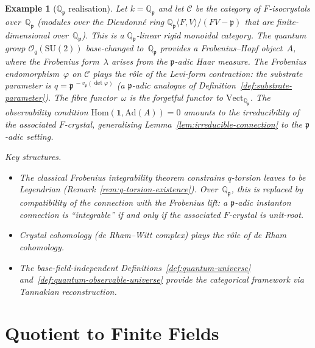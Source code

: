\documentclass[12pt,a4paper]{report}
\newtheorem{example}[theorem]{Example}
\newcommand{\pp}{\mathfrak{p}}
\begin{document}
\begin{example}[$\mathbb{Q}_\pp$ realisation]
\label{ex:p-adic-realisation}
Let $k = \mathbb{Q}_\pp$ and let $\mathcal{C}$ be the category of
$F$-isocrystals over~$\mathbb{Q}_\pp$ (modules over the Dieudonn\'e ring
$\mathbb{Q}_\pp\langle F, V \rangle / (FV - \pp)$ that are finite-dimensional
over~$\mathbb{Q}_\pp$).
This is a $\mathbb{Q}_\pp$-linear rigid monoidal category.
The quantum group $\mathcal{O}_q(\mathrm{SU}(2))$ base-changed
to~$\mathbb{Q}_\pp$ provides a Frobenius--Hopf object~$A$, where the
Frobenius form~$\lambda$ arises from the $\pp$-adic Haar measure.
The Frobenius endomorphism~$\varphi$ on $\mathcal{C}$ plays the
r\^ole of the Levi-form contraction: the substrate parameter is
$q = \pp^{\,-v_\pp(\det\varphi)}$ (a $\pp$-adic analogue of
Definition~\ref{def:substrate-parameter}).  The fibre functor~$\omega$
is the forgetful functor to $\mathrm{Vect}_{\mathbb{Q}_\pp}$.
The observability condition
$\mathrm{Hom}(\mathbf{1}, \mathrm{Ad}(A)) = 0$ amounts to the
irreducibility of the associated $F$-crystal, generalising
Lemma~\ref{lem:irreducible-connection} to the $\pp$-adic setting.

\medskip\noindent\emph{Key structures.}
\begin{itemize}
  \item The classical Frobenius integrability theorem constrains
        $q$-torsion leaves to be Legendrian
        (Remark~\ref{rem:q-torsion-existence}).  Over~$\mathbb{Q}_\pp$,
        this is replaced by compatibility of the connection with the
        Frobenius lift: a $\pp$-adic instanton connection is
        ``integrable'' if and only if the associated $F$-crystal is
        unit-root.
  \item Crystal cohomology (de Rham--Witt complex) plays the r\^ole of
        de Rham cohomology.
  \item The base-field-independent
        Definitions~\ref{def:quantum-universe}
        and~\ref{def:quantum-observable-universe} provide the categorical
        framework via Tannakian reconstruction.
\end{itemize}
\end{example}



\section{Quotient to Finite Fields}
\label{sec:finite-fields}
\end{document}
